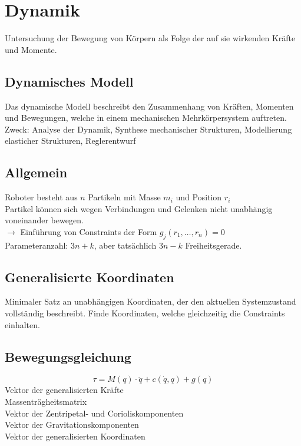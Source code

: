 

\section{Dynamik}
Untersuchung der Bewegung von Körpern als Folge der auf sie wirkenden Kräfte und Momente.

\subsection{Dynamisches Modell}
Das dynamische Modell beschreibt den Zusammenhang von Kräften, Momenten und Bewegungen, welche in einem mechanischen
Mehrkörpersystem auftreten.\\

Zweck: Analyse der Dynamik, Synthese mechanischer Strukturen, Modellierung elasticher Strukturen, Reglerentwurf

\subsection{Allgemein}
Roboter besteht aus \(n\) Partikeln mit Masse \(m_i\) und Position \(r_i\)\\
Partikel können sich wegen Verbindungen und Gelenken nicht unabhängig voneinander bewegen.\\
\(\rightarrow\) Einführung von Constraints der Form \(g_j(r_1, \ldots, r_n) = 0\)\\

Parameteranzahl: \(3n + k\), aber tatsächlich \(3n-k\) Freiheitsgerade.

\subsection{Generalisierte Koordinaten}
Minimaler Satz an unabhängigen Koordinaten, der den aktuellen Systemzustand vollständig beschreibt.
Finde Koordinaten, welche gleichzeitig die Constraints einhalten.


\subsection{Bewegungsgleichung}
\[\tau = M(q) \cdot \ddot{q} + c(\dot{q}, q) + g(q)\]
 Vektor der generalisierten Kräfte\\
 Massenträgheitsmatrix\\
 Vektor der Zentripetal- und Corioliskomponenten\\
 Vektor der Gravitationskomponenten\\
 Vektor der generalisierten Koordinaten

